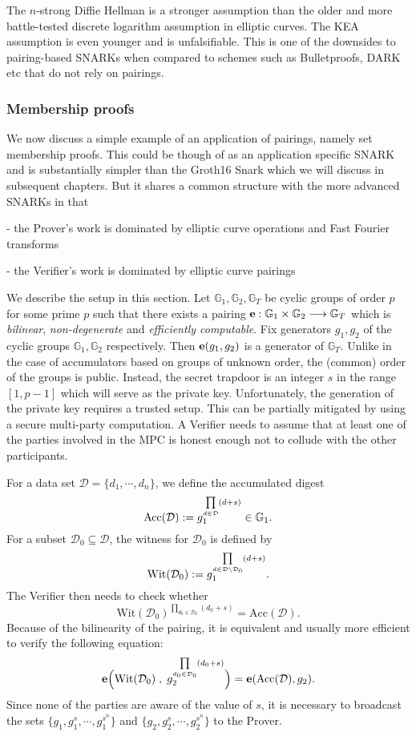 \documentclass[11pt, lettersize, notitlepage, leqno, footskip=0.6cm]{article}
\newcommand{\lra}{\longrightarrow}
\newcommand{\mc}{\mathcal}
\newcommand{\mb}{\mathbb}
\newcommand{\mr}{\mathrm}
\newcommand{\sub}{\subseteq}
\newcommand{\vs}{\vspace{-2mm}}
\newcommand{\noin}{\noindent}
\numberwithin{equation}{section}
\begin{document}
The $n$-strong Diffie Hellman is a stronger assumption than the older and more battle-tested discrete logarithm assumption in elliptic curves. The KEA assumption is even younger and is unfalsifiable. This is one of the downsides to pairing-based SNARKs when compared to schemes such as Bulletproofs, DARK etc that do not rely on pairings.

\subsubsection{\fontsize{11}{11}\selectfont Membership proofs}


We now discuss a simple example of an application of pairings, namely set membership proofs. This could be though of as an application specific SNARK and is substantially simpler than the Groth16 Snark which we will discuss in subsequent chapters. But it shares a common structure with the more advanced SNARKs in that 

\noin - the Prover's work is dominated by elliptic curve operations and Fast Fourier transforms

\noin - the Verifier's work is dominated by elliptic curve pairings

We describe the setup in this section. Let $\mb{G}_1, \mb{G}_2, \mb{G}_T$ be cyclic groups of order $p$ for some prime $p$ such that there exists a pairing ${\bf{e}}:\mb{G}_1\times \mb{G}_2\lra \mb{G}_T$ which is \textit{bilinear}, \textit{non-degenerate} and \textit{efficiently computable}. Fix generators $g_1, g_2$ of the cyclic groups $\mb{G}_1, \mb{G}_2$ respectively. Then ${\bf{e}}(g_1,g_2)$ is a generator of $\mb{G}_T$. Unlike in the case of accumulators based on groups of unknown order, the (common) order of the groups is public. Instead, the secret trapdoor is an integer $s$ in the range $[1, p-1]$ which will serve as the private key. Unfortunately, the generation of the private key requires a trusted setup. This can be partially mitigated by using a secure multi-party computation. A Verifier needs to assume that at least one of the parties involved in the MPC is honest enough not to collude with the other participants. 

For a data set $\mc{D} = \{d_1,\cdots, d_n\}$, we define the accumulated digest \vs $$\mr{Acc}(\mc{D}):= g_1^{\prod\limits_{d\in \mc{D}} (d+s)} \in \mb{G}_1. \vs $$ For a subset $\mc{D}_0\sub \mc{D}$, the witness for $\mc{D}_0$ is defined by \vs $$\mr{Wit}(\mc{D}_0) := g_1^{\prod\limits_{d\in \mc{D}\setminus \mc{D}_0} (d+s)}. \vs $$ The Verifier then needs to check whether $$\mr{Wit}(\mc{D}_0)^{\prod\limits_{d_0\in \mc{D}_0} (d_0+s)} = \mr{Acc}(\mc{D}).$$ Because of the bilinearity of the pairing, it is equivalent and usually more efficient to verify the following equation: \vs $${\bf{e}}\Big(\mr{Wit}(\mc{D}_0)\;,\; g_2^{\prod\limits_{d_0\in \mc{D}_0} (d_0+s)}\Big) = {\bf{e}}(\mr{Acc}(\mc{D}), g_2). \vs $$ Since none of the parties are aware of the value of $s$, it is necessary to broadcast the sets $\{g_1, g_1^s,\cdots , g_1^{s^n}\}$ and $\{g_2, g_2^s,\cdots , g_2^{s^n}\}$ to the Prover.
\end{document}
